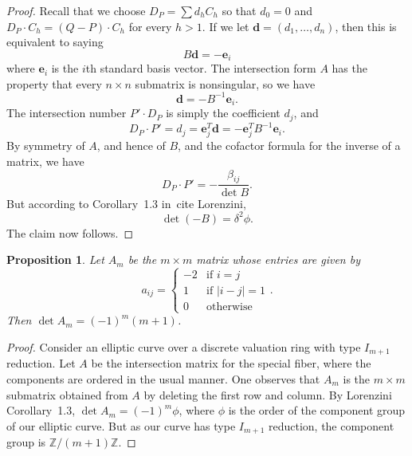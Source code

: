 \documentclass[pagesize,paper=letter]{scrartcl}
\newtheorem{proposition}[thm]{Proposition}
\theoremstyle{definition}
\theoremstyle{remark}
\newcommand{\vd}{\mathbf{d}}
\newcommand{\ve}{\mathbf{e}}
\def\Z{\mathbb{Z}}
\begin{document}
\begin{proof}
  Recall that we choose $D_P = \sum d_h C_h$ so that $d_0 = 0$ and $D_P \cdot C_h = (Q - P) \cdot C_h$ for every $h > 1$. If we let $\vd = (d_1, \dots, d_n)$, then this is equivalent to saying
  \[
  B\vd = -\ve_i
  \]
  where $\ve_i$ is the $i$th standard basis vector. The intersection form $A$ has the property that every $n \times n$ submatrix is nonsingular, so we have
  \[
  \vd = -B^{-1}\ve_i.
  \]
  The intersection number $P' \cdot D_P$ is simply the coefficient $d_j$, and
  \[
  D_P \cdot P' = d_j = \ve_j^T \vd = -\ve_j^TB^{-1}\ve_i.
  \]
  By symmetry of $A$, and hence of $B$, and the cofactor formula for the inverse of a matrix, we have
  \[
  D_P \cdot P' = - \frac{\beta_{ij}}{\det B}.
  \]
  But according to Corollary~1.3 in~cite Lorenzini,
  \[
  \det (-B) = \delta^2 \phi.
  \]
  The claim now follows.
\end{proof}

\begin{proposition}\label{prop:am-defn-det}
  Let $A_m$ be the $m \times m$ matrix whose entries are given by
  \[
  a_{ij} = \begin{cases}
    -2 & \text{if } i = j \\
    1 & \text{if } |i - j| = 1\\
    0 & \text{otherwise}
  \end{cases}.
  \]
  Then $\det A_m = (-1)^m (m+1)$.
\end{proposition}

\begin{proof}
  Consider an elliptic curve over a discrete valuation ring with type $I_{m+1}$ reduction. Let $A$ be the intersection matrix for the special fiber, where the components are ordered in the usual manner. One observes that $A_m$ is the $m \times m$ submatrix obtained from $A$ by deleting the first row and column. By Lorenzini Corollary~1.3, $\det A_m = (-1)^m \phi$, where $\phi$ is the order of the component group of our elliptic curve. But as our curve has type $I_{m+1}$ reduction, the component group is $\Z/(m+1)\Z$.
\end{proof}
\end{document}
